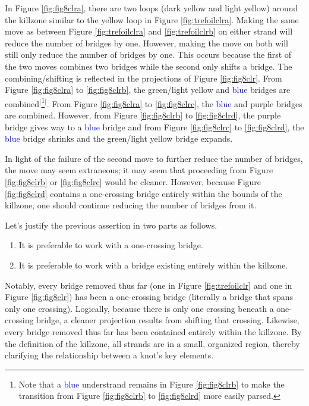 \documentclass[titlepage]{article}
\begin{document}
In Figure \ref{fig:fig8clra}, there are two loops (\textcolor{yly}{dark yellow} and \textcolor{ylz}{light yellow}) around the killzone similar to the \textcolor{ylx}{yellow} loop in Figure \ref{fig:trefoilclra}. Making the same move as between Figure \ref{fig:trefoilclra} and \ref{fig:trefoilclrb} on either strand will reduce the number of bridges by one. However, making the move on both will still only reduce the number of bridges by one. This occurs because the first of the two moves combines two bridges while the second only shifts a bridge. The combining/shifting is reflected in the projections of Figure \ref{fig:fig8clr}. From Figure \ref{fig:fig8clra} to \ref{fig:fig8clrb}, the \textcolor{grx}{green}/\textcolor{ylz}{light yellow} and \textcolor{blue}{blue} bridges are combined$^[$\footnote{Note that a \textcolor{blue}{blue} understrand remains in Figure \ref{fig:fig8clrb} to make the transition from Figure \ref{fig:fig8clrb} to \ref{fig:fig8clrd} more easily parsed.}$^]$. From Figure \ref{fig:fig8clra} to \ref{fig:fig8clrc}, the \textcolor{blue}{blue} and \textcolor{pux}{purple} bridges are combined. However, from Figure \ref{fig:fig8clrb} to \ref{fig:fig8clrd}, the \textcolor{pux}{purple} bridge gives way to a \textcolor{blue}{blue} bridge and from Figure \ref{fig:fig8clrc} to \ref{fig:fig8clrd}, the \textcolor{blue}{blue} bridge shrinks and the \textcolor{grx}{green}/\textcolor{ylz}{light yellow} bridge expands.\par
In light of the failure of the second move to further reduce the number of bridges, the move may seem extraneous; it may seem that proceeding from Figure \ref{fig:fig8clrb} or \ref{fig:fig8clrc} would be cleaner. However, because Figure \ref{fig:fig8clrd} contains a one-crossing bridge entirely within the bounds of the killzone, one should continue reducing the number of bridges from it.\par
Let's justify the previous assertion in two parts as follows.

\begin{conj}
    \begin{enumerate}
        \item It is preferable to work with a one-crossing bridge.
        \item It is preferable to work with a bridge existing entirely within the killzone.
    \end{enumerate}
\end{conj}

Notably, every bridge removed thus far (one in Figure \ref{fig:trefoilclr} and one in Figure \ref{fig:fig8clr}) has been a one-crossing bridge (literally a bridge that spans only one crossing). Logically, because there is only one crossing beneath a one-crossing bridge, a cleaner projection results from shifting that crossing. Likewise, every bridge removed thus far has been contained entirely within the killzone. By the definition of the killzone, all strands are in a small, organized region, thereby clarifying the relationship between a knot's key elements.
\end{document}
